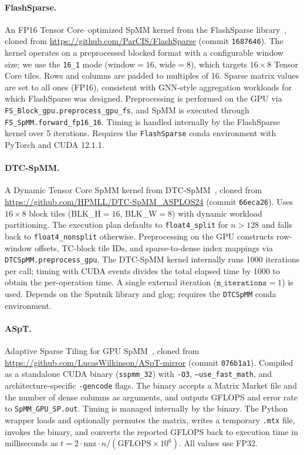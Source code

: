 \paragraph{FlashSparse.}
An FP16 Tensor Core--optimized SpMM kernel from the FlashSparse library~\cite{flashsparse2025},
cloned from \url{https://github.com/ParCIS/FlashSparse} (commit \texttt{1687646}).
The kernel operates on a preprocessed blocked format with a configurable window size; we use the \texttt{16\_1} mode (window$=16$, wide$=8$), which targets $16 \times 8$ Tensor Core tiles.
Rows and columns are padded to multiples of 16.
Sparse matrix values are set to all ones (FP16), consistent with GNN-style aggregation workloads for which FlashSparse was designed.
Preprocessing is performed on the GPU via \texttt{FS\_Block\_gpu.preprocess\_gpu\_fs}, and SpMM is executed through \texttt{FS\_SpMM.forward\_fp16\_16}.
Timing is handled internally by the FlashSparse kernel over 5 iterations.
Requires the \texttt{FlashSparse} conda environment with PyTorch and CUDA 12.1.1.

\paragraph{DTC-SpMM.}
A Dynamic Tensor Core SpMM kernel from DTC-SpMM~\cite{dtcspmm2024},
cloned from \url{https://github.com/HPMLL/DTC-SpMM_ASPLOS24} (commit \texttt{66eca26}).
Uses $16 \times 8$ block tiles (BLK\_H$=16$, BLK\_W$=8$) with dynamic workload partitioning.
The execution plan defaults to \texttt{float4\_split} for $n > 128$ and falls back to \texttt{float4\_nonsplit} otherwise.
Preprocessing on the GPU constructs row-window offsets, TC-block tile IDs, and sparse-to-dense index mappings via \texttt{DTCSpMM.preprocess\_gpu}.
The DTC-SpMM kernel internally runs 1000 iterations per call; timing with CUDA events divides the total elapsed time by 1000 to obtain the per-operation time.
A single external iteration ($\texttt{n\_iterations}=1$) is used.
Depends on the Sputnik library and glog; requires the \texttt{DTCSpMM} conda environment.

\paragraph{ASpT.}
Adaptive Sparse Tiling for GPU SpMM~\cite{aspt2019},
cloned from \url{https://github.com/LucasWilkinson/ASpT-mirror} (commit \texttt{076b1a1}).
Compiled as a standalone CUDA binary (\texttt{sspmm\_32}) with \texttt{-O3}, \texttt{--use\_fast\_math}, and architecture-specific \texttt{-gencode} flags.
The binary accepts a Matrix Market file and the number of dense columns as arguments, and outputs GFLOPS and error rate to \texttt{SpMM\_GPU\_SP.out}.
Timing is managed internally by the binary.
The Python wrapper loads and optionally permutes the matrix, writes a temporary \texttt{.mtx} file, invokes the binary, and converts the reported GFLOPS back to execution time in milliseconds as $t = 2 \cdot \text{nnz} \cdot n / (\text{GFLOPS} \times 10^6)$.
All values use FP32.

